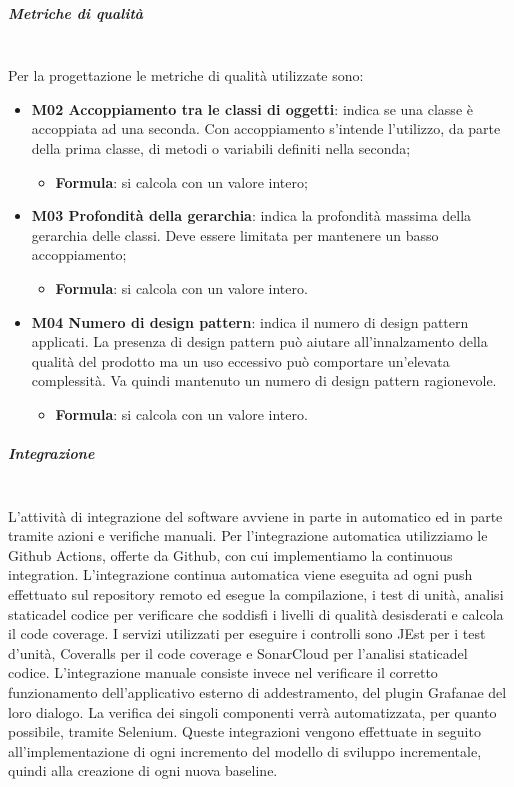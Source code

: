 \subparagraph{Metriche di qualità} \mbox{} \\
Per la progettazione le metriche di qualità utilizzate sono:
\begin{itemize}
	\item \textbf{M02 Accoppiamento tra le classi di oggetti}: indica se una classe è accoppiata ad una seconda. Con accoppiamento s'intende l'utilizzo, da parte della prima classe, di metodi o variabili definiti nella seconda; 
	\begin{itemize}
		\item[] \textbf{Formula}: si calcola con un valore intero;
	\end{itemize}
	\item \textbf{M03 Profondità della gerarchia}: indica la profondità massima della gerarchia delle classi. Deve essere limitata per mantenere un basso accoppiamento;
	\begin{itemize}
		\item[] \textbf{Formula}: si calcola con un valore intero.
	\end{itemize} 	
	\item \textbf{M04 Numero di design pattern}: indica il numero di design pattern applicati. La presenza di design pattern può aiutare all'innalzamento della qualità del prodotto ma un uso eccessivo può comportare un'elevata complessità. Va quindi mantenuto un numero di design pattern ragionevole.
	\begin{itemize}
		\item[] \textbf{Formula}: si calcola con un valore intero.
	\end{itemize} 	
\end{itemize}

\subparagraph{Integrazione} \mbox{} \\
L'attività di integrazione del software avviene in parte in automatico ed in parte tramite azioni e verifiche manuali.
\newline
Per l'integrazione automatica utilizziamo le Github Actions, offerte da Github, con cui implementiamo la continuous integration. L'integrazione continua automatica viene eseguita ad ogni push effettuato sul repository remoto ed esegue la compilazione, i test di unità, analisi statica\glosp del codice per verificare che soddisfi i livelli di qualità desisderati e calcola il code coverage. I servizi utilizzati per eseguire i controlli sono JEst per i test d'unità, Coveralls per il code coverage e SonarCloud per l'analisi statica\glosp del codice.
\newline
L'integrazione manuale consiste invece nel verificare il corretto funzionamento dell'applicativo esterno di addestramento, del plugin Grafana\glosp e del loro dialogo. La verifica dei singoli componenti verrà automatizzata, per quanto possibile, tramite Selenium\glo. Queste integrazioni vengono effettuate in seguito all'implementazione di ogni incremento del modello di sviluppo incrementale, quindi alla creazione di ogni nuova baseline\glo.

